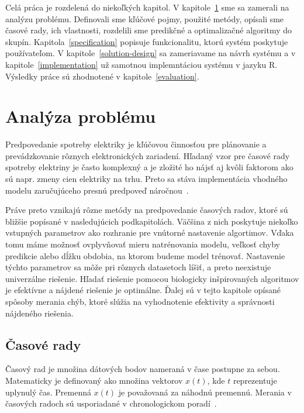 \documentclass[a4paper,slovak,12pt,appendix]{article}
\begin{document}
Celá práca je rozdelená do niekoľkých kapitol. V
kapitole~\ref{problem-analysis} sme sa zamerali na analýzu problému. Definovali
sme kľúčové pojmy, použité metódy, opísali sme časové rady, ich vlastnosti,
rozdelili sme predikčné a optimalizačné algoritmy do skupín.
Kapitola~\ref{specification} popisuje funkcionalitu, ktorú systém poskytuje
používateľom. V kapitole~\ref{solution-design} sa zameriavame na návrh systému
a v kapitole~\ref{implementation} už samotnou implemntáciou systému v jazyku R.
Výsledky práce sú zhodnotené v kapitole~\ref{evaluation}.


\newpage
\section{Analýza problému}
\label{problem-analysis}
Predpovedanie spotreby elektriky je kľúčovou činnosťou pre plánovanie
a prevádzkovanie rôznych elektronických zariadení. Hľadaný vzor pre časové
rady spotreby elektriny je často komplexný a je zložité ho nájsť aj kvôli
faktorom ako sú napr. zmeny cien elektriky na trhu. Preto sa stáva
implementácia vhodného modelu zaručujúceho presnú predpoveď
náročnou~\cite{Mahalakshmi2016}.

Práve preto vznikajú rôzne metódy na predpovedanie časových radov, ktoré sú
bližšie popísané v nasledujúcich podkapitolách. Väčšina z nich poskytuje
niekoľko vstupných parametrov ako rozhranie pre vnútorné nastavenie algortimov.
Vďaka tomu máme možnosť ovplyvňovať mieru natrénovania modelu, veľkosť chyby
predikcie alebo dĺžku obdobia, na ktorom budeme model trénovať. Nastavenie
týchto parametrov sa môže pri rôznych datasetoch líšiť, a preto neexistuje
univerzálne riešenie. Hľadať riešenie pomocou biologicky inšpirovaných
algoritmov je efektívne a nájdené riešenie je optimálne. Ďalej sú v tejto
kapitole opísané spôsoby merania chýb, ktoré slúžia na vyhodnotenie efektivity
a správnosti nájdeného riešenia.


\subsection{Časové rady}
Časový rad je množina dátových bodov nameraná v čase postupne za sebou.
Matematicky je definovaný ako množina vektorov $x(t)$, kde $t$ reprezentuje
uplynulý čas. Premenná $x(t)$ je považovaná za náhodnú premennú.
Merania v časových radoch sú usporiadané v chronologickom
poradí~\cite{Agrawal2013}.
\end{document}
